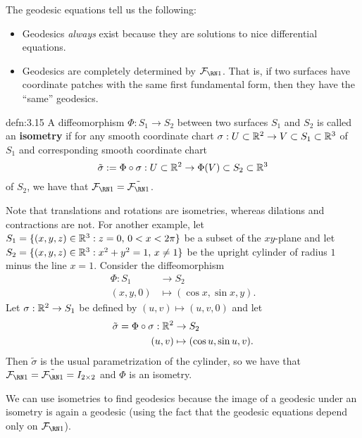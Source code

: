 The geodesic equations tell us the following: 
\begin{itemize}
    \item Geodesics \emph{always} exist because they are solutions to 
    nice differential equations. 
    \item Geodesics are completely determined by $\FFF$. That is, if 
    two surfaces have coordinate patches with the same first fundamental 
    form, then they have the ``same'' geodesics.
\end{itemize}

\begin{defn}{defn:3.15}
    A diffeomorphism $\Phi : S_1 \to S_2$ between two surfaces $S_1$ and $S_2$ 
    is called an {\bf isometry} if for any smooth coordinate chart 
    $\sigma : U \subset \mathbb{R}^2 \to V \subset S_1 \subset \mathbb{R}^3$ of $S_1$ 
    and corresponding smooth coordinate chart 
    \[ \tilde\sigma := \Phi \circ \sigma : U \subset \mathbb{R}^2 \to 
    \Phi(V) \subset S_2 \subset \mathbb{R}^3 \] 
    of $S_2$, we have that $\FFF = \tilde\FFF$.  
\end{defn}\vspace{-0.25cm}

Note that translations and rotations are isometries, whereas dilations 
and contractions are not. For another example, let $S_1 = 
\{(x, y, z) \in \mathbb{R}^3 : z = 0,\, 0 < x < 2\pi\}$ be a subset of the $xy$-plane and let $S_2 = 
\{(x, y, z) \in \mathbb{R}^3 : x^2 + y^2 = 1,\, x \neq 1\}$ be the upright cylinder of radius $1$ minus the line $x=1$. 
Consider the diffeomorphism
\begin{align*}
    \Phi : S_1 &\to S_2 \\ 
    (x, y, 0) &\mapsto (\cos x, \sin x, y). 
\end{align*}
Let $\sigma : \mathbb{R}^2 \to S_1$ be defined by $(u, v) \mapsto (u, v, 0)$ and let 
\begin{align*} 
    \tilde\sigma = \Phi \circ \sigma : \mathbb{R}^2 &\to S_2 \\ 
    (u, v) &\mapsto (\cos u, \sin u, v). 
\end{align*} 
Then $\tilde\sigma$ is the usual parametrization of the cylinder, so 
we have that $\FFF = \tilde\FFF = I_{2\times 2}$ and $\Phi$ 
is an isometry.

We can use isometries to find geodesics because the image of a geodesic 
under an isometry is again a geodesic (using the fact that 
the geodesic equations depend only on $\FFF$).

